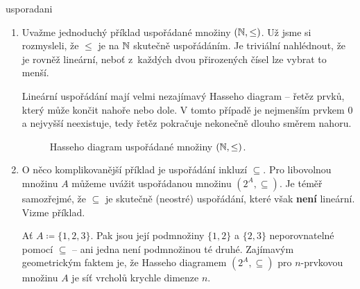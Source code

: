 \begin{example}{}{usporadani}
 \vspace{-\parskip}
 \begin{enumerate}
  \item Uvažme jednoduchý příklad uspořádané množiny $(\mathbb{N}, \leq )$. Už jsme si
   rozmysleli, že $ \leq $ je na $\mathbb{N}$ skutečně uspořádáním. Je triviální
   nahlédnout, že je rovněž lineární, neboť z~každých dvou přirozených čísel lze
   vybrat to menší.
  
   Lineární uspořádání mají velmi nezajímavý Hasseho diagram -- řetěz prvků,
   který může končit nahoře nebo dole. V tomto případě je nejmenším prvkem $0$ a
   nejvyšší neexistuje, tedy řetěz pokračuje nekonečně dlouho směrem nahoru.
   \begin{figure}[H]
    \centering

    \caption{Hasseho diagram uspořádané množiny $(\mathbb{N}, \leq )$.}
    \label{fig:hasseho-diagram-N}
   \end{figure}
  \item O něco komplikovanější příklad je uspořádání inkluzí $ \subseteq $. Pro
   libovolnou množinu $A$ můžeme uvážit uspořádanou množinu $(2^{A}, \subseteq
   )$. Je téměř samozřejmé, že $ \subseteq $ je skutečně (neostré) uspořádání,
   které však \textbf{není} lineární. Vizme příklad.
  
   Ať $A \coloneqq \{1,2,3\}$. Pak jsou její podmnožiny $\{1,2\}$ a $\{2,3\}$
   neporovnatelné pomocí $ \subseteq $ -- ani jedna není podmnožinou té druhé.
   Zajímavým geometrickým faktem je, že Hasseho diagramem $(2^{A}, \subseteq )$
   pro $n$-prvkovou množinu $A$ je síť vrcholů krychle dimenze $n$.
   \begin{figure}[H]
    \centering
\end{figure}
\end{enumerate}
\end{example}
